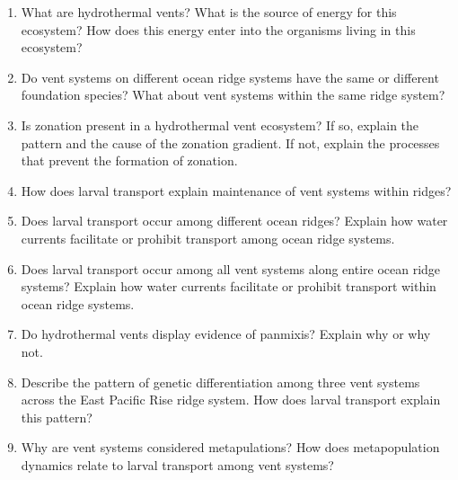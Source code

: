 \documentclass[letterpaper]{tufte-handout}
\begin{document}
\begin{enumerate}

\item What are hydrothermal vents? What is the source of energy for this ecosystem?  How does this energy enter into the organisms living in this ecosystem?

\item Do vent systems on different ocean ridge systems have the same or different foundation species? What about vent systems within the same ridge system?

\item Is zonation present in a hydrothermal vent ecosystem? If so, explain the pattern and the cause of the zonation gradient. If not, explain the processes that prevent the formation of zonation.

\item How does larval transport explain maintenance of vent systems within ridges?

\item Does larval transport occur among different ocean ridges? Explain how water currents facilitate or prohibit transport among ocean ridge systems. 

\item Does larval transport occur among all vent systems along entire ocean ridge systems? Explain how water currents facilitate or prohibit transport within ocean ridge systems. 

\item Do hydrothermal vents display evidence of panmixis? Explain why or why not.

\item Describe the pattern of genetic differentiation among three vent systems across the East Pacific Rise ridge system. How does larval transport explain this pattern?

\item Why are vent systems considered metapulations? How does metapopulation dynamics relate to larval transport among vent systems?

\end{enumerate}
\end{document}

